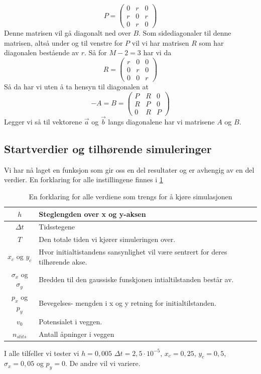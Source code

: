 \documentclass[reprint,english,notitlepage]{revtex4-2}  %
\begin{document}
$$
P=\begin{pmatrix}
	0 &r&0\\
	r &0 &r \\
	0 & r& 0
\end{pmatrix}
$$
Denne matrisen vil gå diagonalt ned over $B$. Som sidediagonaler til denne matrisen, altså under og til venstre for $P$ vil vi har matrisen $R$ som har diagonalen bestående av $r$. Så for $M-2=3$ har vi da
$$
R=\begin{pmatrix}
	r&0&0 \\
	0&r&0 \\
	0&0&r
\end{pmatrix}
$$
Så da har vi uten å ta hensyn til diagonalen at
$$
-A=B=\begin{pmatrix}
	P&R&0 \\
	R&P&0 \\
	0&R&P
\end{pmatrix}
$$
Legger vi så til vektorene $\vec{a}$ og $\vec{b}$ langs diagonalene har vi matrisene $A$ og $B$.
\subsection{Startverdier og tilhørende simuleringer}
Vi har nå laget en funksjon som gir oss en del resultater og er avhengig av en del verdier. En forklaring for alle instillingene finnes i \ref{table:Initverdier}
\begin{table}[H]
	\begin{tabular}{|c|p{20mm}|}
		\hline
		$h$ & Steglengden over x og y-aksen \\\hline 
		$\Delta t$ & Tidsstegene \\\hline 
		$T$ & Den totale tiden vi kjører simuleringen over. \\\hline
		$x_c$ og $y_c$ & Hvor initialtistandens sansynlighet vil være sentrert for deres tilhørende akse. \\\hline 
		$\sigma_x$ og $\sigma_y$ & Bredden til den gaussiske funskjonen intialtilstanden består av. \\\hline 
		$p_x$ og $p_y$ & Bevegelses- mengden i x og y retning for initialtilstanden. \\\hline 
		$v_0$ & Potensialet i veggen. \\\hline
		$n_{slits}$ & Antall åpninger i veggen \\\hline
	\end{tabular}
\caption{En forklaring for alle verdiene som trengs for å kjøre simulasjonen}
\label{table:Initverdier}
\end{table}
I alle tilfeller vi tester vi $h=0,005$ $\Delta t=2,5\cdot 10^{-5}$, $x_c=0,25$, $y_c=0,5$, $\sigma_x=0,05$ og $p_y=0$. De andre vil vi variere.
\end{document}
